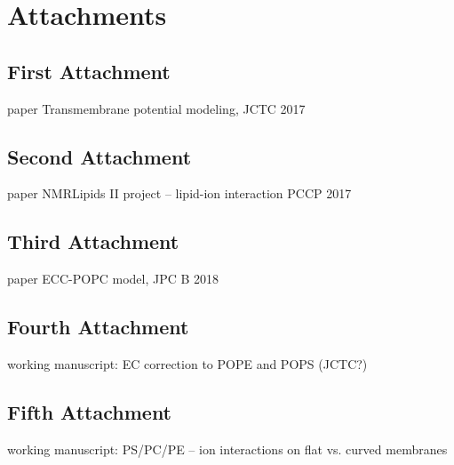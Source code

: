 \documentclass[12pt,a4paper]{report}
\let\openright=\clearpage
\begin{document}
\chapter{Attachments}

\section{First Attachment}
 paper Transmembrane potential modeling, JCTC 2017
\section{Second Attachment}
 paper NMRLipids II project -- lipid-ion interaction PCCP 2017
\section{Third Attachment}
 paper ECC-POPC model, JPC B 2018
\section{Fourth Attachment}
 working manuscript: EC correction to POPE and POPS  (JCTC?)
\section{Fifth Attachment}
 working manuscript: PS/PC/PE -- ion interactions on flat vs. curved membranes

\openright
\end{document}
